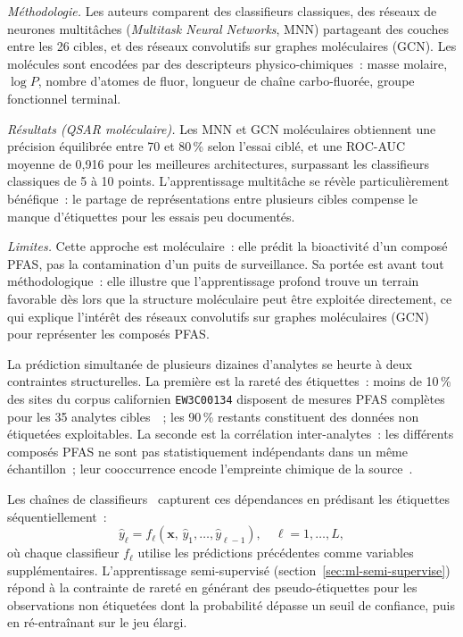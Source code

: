 \emph{M\'ethodologie.}
Les auteurs comparent des classifieurs classiques, des r\'eseaux de neurones multit\^aches (\emph{Multitask Neural Networks}, MNN) partageant des couches entre les 26 cibles, et des r\'eseaux convolutifs sur graphes mol\'eculaires (GCN).
Les mol\'ecules sont encod\'ees par des descripteurs physico-chimiques~: masse molaire, $\log P$, nombre d'atomes de fluor, longueur de cha\^ine carbo-fluor\'ee, groupe fonctionnel terminal.

\emph{R\'esultats (QSAR mol\'eculaire).}
Les MNN et GCN mol\'eculaires obtiennent une pr\'ecision \'equilibr\'ee entre 70 et 80\,\% selon l'essai cibl\'e, et une ROC-AUC moyenne de 0,916 pour les meilleures architectures, surpassant les classifieurs classiques de 5 \`a 10 points.
L'apprentissage multit\^ache se r\'ev\`ele particuli\`erement b\'en\'efique~: le partage de repr\'esentations entre plusieurs cibles compense le manque d'\'etiquettes pour les essais peu document\'es.

\emph{Limites.}
Cette approche est mol\'eculaire~: elle pr\'edit la bioactivit\'e d'un compos\'e PFAS, pas la contamination d'un puits de surveillance.
Sa port\'ee est avant tout m\'ethodologique~: elle illustre que l'apprentissage profond trouve un terrain favorable d\`es lors que la structure mol\'eculaire peut \^etre exploit\'ee directement, ce qui explique l'int\'er\^et des r\'eseaux convolutifs sur graphes mol\'eculaires (GCN) pour repr\'esenter les compos\'es PFAS.


\label{sec:chap2-semisup}

La pr\'ediction simultan\'ee de plusieurs dizaines d'analytes se heurte \`a deux contraintes structurelles.
La premi\`ere est la raret\'e des \'etiquettes~: moins de 10\,\% des sites du corpus californien \texttt{EW3C00134} disposent de mesures PFAS compl\`etes pour les 35 analytes cibles~\cite{dong2024pfas}~; les 90\,\% restants constituent des donn\'ees non \'etiquet\'ees exploitables.
La seconde est la corr\'elation inter-analytes~: les diff\'erents compos\'es PFAS ne sont pas statistiquement ind\'ependants dans un m\^eme \'echantillon~; leur cooccurrence encode l'empreinte chimique de la source~\cite{prevedouros2006pfas}.

Les cha\^ines de classifieurs~\cite{read2011classifier} capturent ces d\'ependances en pr\'edisant les \'etiquettes s\'equentiellement~:
\begin{equation}
    \hat{y}_\ell = f_\ell\!\left(\mathbf{x},\, \hat{y}_1, \ldots, \hat{y}_{\ell-1}\right), \quad \ell = 1,\ldots, L,
    \label{eq:classif-chain}
\end{equation}
o\`u chaque classifieur $f_\ell$ utilise les pr\'edictions pr\'ec\'edentes comme variables suppl\'ementaires.
L'apprentissage semi-supervis\'e (section~\ref{sec:ml-semi-supervise}) r\'epond \`a la contrainte de raret\'e en g\'en\'erant des pseudo-\'etiquettes pour les observations non \'etiquet\'ees dont la probabilit\'e d\'epasse un seuil de confiance, puis en r\'e-entra\^inant sur le jeu \'elargi.

